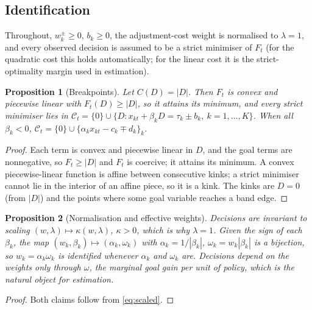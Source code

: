 \documentclass[pdflatex,sn-basic]{sn-jnl}
\theoremstyle{thmstyleone}\newtheorem{proposition}{Proposition}\newtheorem{theorem}{Theorem}
\theoremstyle{thmstylethree}\newtheorem{remark}{Remark}
\begin{document}
\subsection{Identification}\label{sec:ident}
Throughout, $w_k^\pm\ge0$, $b_k\ge0$, the adjustment-cost weight is normalised to $\lambda=1$, and every observed decision is assumed to be a strict minimiser of $F_t$ (for the quadratic cost this holds automatically; for the linear cost it is the strict-optimality margin used in estimation).

\begin{proposition}[Breakpoints]\label{prop:bp}
Let $C(D)=|D|$. Then $F_t$ is convex and piecewise linear with $F_t(D)\ge|D|$, so it attains its minimum, and every strict minimiser lies in $\mathcal{C}_t=\{0\}\cup\{D: x_{kt}+\beta_kD=\tau_k\pm b_k,\ k=1,\dots,K\}$. When all $\beta_k<0$, $\mathcal{C}_t=\{0\}\cup\{\alpha_kx_{kt}-c_k\mp d_k\}_k$.
\end{proposition}
\begin{proof}
Each term is convex and piecewise linear in $D$, and the goal terms are nonnegative, so $F_t\ge|D|$ and $F_t$ is coercive; it attains its minimum. A convex piecewise-linear function is affine between consecutive kinks; a strict minimiser cannot lie in the interior of an affine piece, so it is a kink. The kinks are $D=0$ (from $|D|$) and the points where some goal variable reaches a band edge.
\end{proof}

\begin{proposition}[Normalisation and effective weights]\label{prop:eff}
Decisions are invariant to scaling $(w,\lambda)\mapsto\kappa(w,\lambda)$, $\kappa>0$, which is why $\lambda=1$. Given the sign of each $\beta_k$, the map $(w_k,\beta_k)\mapsto(\alpha_k,\omega_k)$ with $\alpha_k=1/|\beta_k|$, $\omega_k=w_k|\beta_k|$ is a bijection, so $w_k=\alpha_k\omega_k$ is identified whenever $\alpha_k$ and $\omega_k$ are. Decisions depend on the weights only through $\omega$, the marginal goal gain per unit of policy, which is the natural object for estimation.
\end{proposition}
\begin{proof}
Both claims follow from \eqref{eq:scaled}.
\end{proof}
\end{document}
